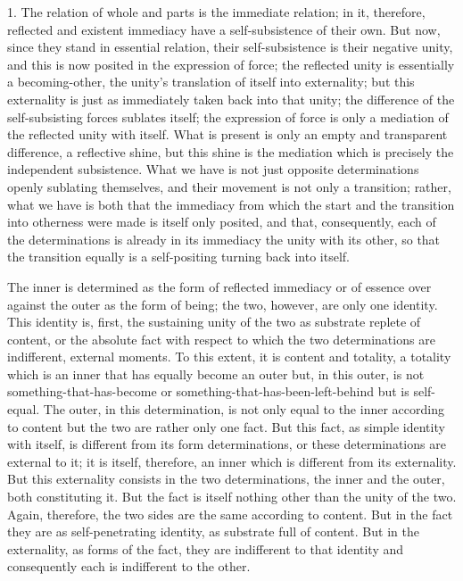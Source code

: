 1. The relation of whole and parts is the immediate relation;
in it, therefore, reflected and existent immediacy have
a self-subsistence of their own.
But now, since they stand in essential relation,
their self-subsistence is their negative unity,
and this is now posited in the expression of force;
the reflected unity is essentially a becoming-other,
the unity's translation of itself into externality;
but this externality is just as immediately taken back into that unity;
the difference of the self-subsisting forces sublates itself;
the expression of force is only a mediation of the reflected unity with itself.
What is present is only an empty and transparent difference, a reflective shine,
but this shine is the mediation which is precisely the independent subsistence.
What we have is not just opposite determinations openly sublating themselves,
and their movement is not only a transition;
rather, what we have is both that the immediacy
from which the start and the transition into otherness
were made is itself only posited,
and that, consequently, each of the determinations is
already in its immediacy the unity with its other,
so that the transition equally is a self-positing turning back into itself.

The inner is determined as the form of reflected immediacy or of essence
over against the outer as the form of being;
the two, however, are only one identity.
This identity is, first, the sustaining unity of the two as
substrate replete of content, or the absolute fact with respect to which
the two determinations are indifferent, external moments.
To this extent, it is content and totality, a totality
which is an inner that has equally become an outer
but, in this outer, is not something-that-has-become
or something-that-has-been-left-behind but is self-equal.
The outer, in this determination, is not only
equal to the inner according to content
but the two are rather only one fact.
But this fact, as simple identity with itself, is
different from its form determinations,
or these determinations are external to it;
it is itself, therefore, an inner which is different from its externality.
But this externality consists in the two determinations,
the inner and the outer, both constituting it.
But the fact is itself nothing other than the unity of the two.
Again, therefore, the two sides are the same according to content.
But in the fact they are as self-penetrating identity,
as substrate full of content.
But in the externality, as forms of the fact,
they are indifferent to that identity
and consequently each is indifferent to the other.

